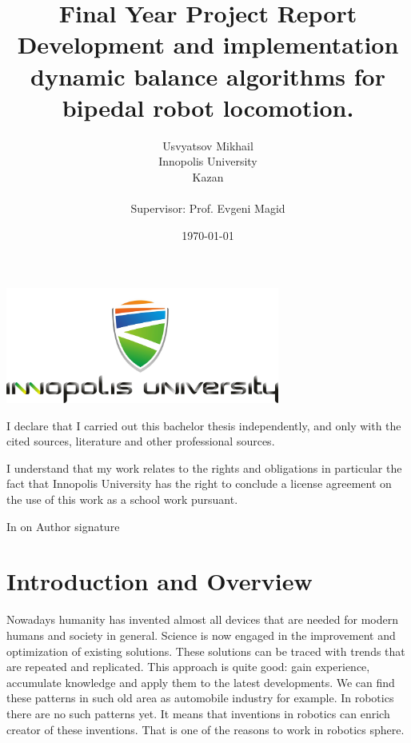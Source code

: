 \documentclass[12pt,a4paper]{report}
\begin{document}
	\title{Final Year Project Report\\ Development and implementation dynamic balance algorithms for bipedal robot locomotion.}
	\author{Usvyatsov Mikhail\\Innopolis University\\Kazan\\  ~\\ \normalsize Supervisor: Prof. Evgeni Magid}
	\date{\normalsize \today}
	\centerline{\mbox{\includegraphics[width=90mm]{iu.jpg}}}
	{\let\newpage\relax\maketitle}
	
		\newpage
		\noindent
		I declare that I carried out this bachelor thesis independently, and only with the cited
		sources, literature and other professional sources.
		
		\medskip\noindent
		I understand that my work relates to the rights and obligations in particular the fact that Innopolis
		University has the right to conclude a license agreement on the use of this
		work as a school work pursuant.
		
		\vspace{18mm}
		\noindent
		In \makebox[4cm]{\dotfill} on \makebox[2.5cm]{\dotfill}
		\hspace*{\fill}
		Author signature
		\hspace*{\fill}
		
	
	\newpage
	
	\tableofcontents
	
	\newpage

	\chapter{Introduction and Overview}
		Nowadays humanity has invented almost all devices that are needed for modern humans and society in general. Science is now engaged in the improvement and optimization of existing solutions. These solutions can be traced with trends that are repeated and replicated. This approach is quite good: gain experience, accumulate knowledge and apply them to the latest developments. We can find these patterns in such old area as automobile industry for example. In robotics there are no such patterns yet. It means that inventions in robotics can enrich creator of these inventions. That is one of the reasons to work in robotics sphere.
	
\end{document}
